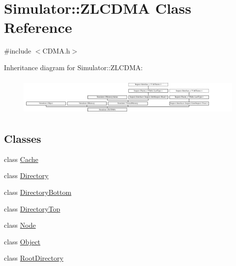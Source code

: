 \hypertarget{class_simulator_1_1_z_l_c_d_m_a}{\section{Simulator\+:\+:Z\+L\+C\+D\+M\+A Class Reference}
\label{class_simulator_1_1_z_l_c_d_m_a}
}


{\ttfamily \#include $<$C\+D\+M\+A.\+h$>$}

Inheritance diagram for Simulator\+:\+:Z\+L\+C\+D\+M\+A\+:\begin{figure}[H]
\begin{center}
\leavevmode
\includegraphics[height=1.917808cm]{class_simulator_1_1_z_l_c_d_m_a}
\end{center}
\end{figure}
\subsection*{Classes}
\begin{DoxyCompactItemize}
\item 
class \hyperlink{class_simulator_1_1_z_l_c_d_m_a_1_1_cache}{Cache}
\item 
class \hyperlink{class_simulator_1_1_z_l_c_d_m_a_1_1_directory}{Directory}
\item 
class \hyperlink{class_simulator_1_1_z_l_c_d_m_a_1_1_directory_bottom}{Directory\+Bottom}
\item 
class \hyperlink{class_simulator_1_1_z_l_c_d_m_a_1_1_directory_top}{Directory\+Top}
\item 
class \hyperlink{class_simulator_1_1_z_l_c_d_m_a_1_1_node}{Node}
\item 
class \hyperlink{class_simulator_1_1_z_l_c_d_m_a_1_1_object}{Object}
\item 
class \hyperlink{class_simulator_1_1_z_l_c_d_m_a_1_1_root_directory}{Root\+Directory}
\end{DoxyCompactItemize}
